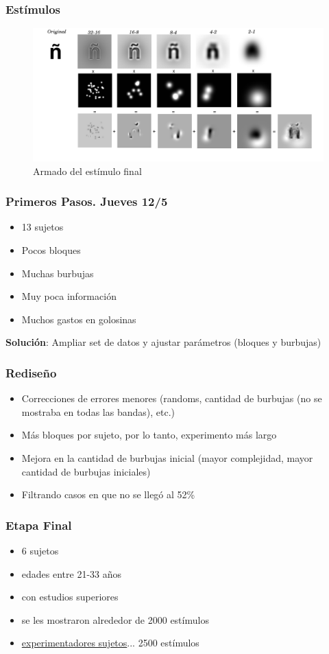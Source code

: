 \documentclass{beamer}
\begin{document}
	\begin{frame}
	\frametitle{Est\'imulos}
	\begin{figure}
	\includegraphics[width=\textwidth]{graficos/estimulofinal.png}
	\caption{Armado del est\'imulo final}
	\end{figure}
	\end{frame}

	\begin{frame}
	\frametitle{Primeros Pasos. Jueves 12/5}
	\begin{itemize}
	\item 13 sujetos
	\item Pocos bloques
	\item Muchas burbujas
	\item Muy poca información \pause
	\item Muchos gastos en golosinas\pause
	\end{itemize}
	\textbf{Solución}: Ampliar set de datos y ajustar parámetros (bloques y burbujas)
	\end{frame}

	\begin{frame}
	\frametitle{Rediseño}
	\begin{itemize}
	\item Correcciones de errores menores (randoms, cantidad de burbujas (no se mostraba en todas las bandas), etc.)
	\item Más bloques por sujeto, por lo tanto, experimento más largo
	\item Mejora en la cantidad de burbujas inicial (mayor complejidad, mayor cantidad de burbujas iniciales)
	\item Filtrando casos en que no se llegó al 52\%
	\end{itemize}

	\end{frame}


	\begin{frame}
	\frametitle{Etapa Final}
	\begin{itemize}
	\item 6 sujetos
	\item edades entre 21-33 años
	\item con estudios superiores
	\item se les mostraron alrededor de 2000 est\'imulos
	\item \underline{experimentadores sujetos}... 2500 est\'imulos
	\end{itemize}
	\end{frame}
\end{document}
